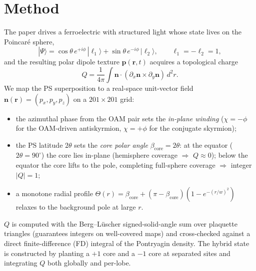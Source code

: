\documentclass[11pt]{article}
\begin{document}
\section{Method}
The paper drives a ferroelectric with structured light whose state lives on the
Poincar\'e sphere,
\begin{equation}
|\Psi\rangle = \cos\theta\, e^{+i\phi}\,|\ell_1\rangle
             + \sin\theta\, e^{-i\phi}\,|\ell_2\rangle,\qquad \ell_1=-\ell_2=1,
\end{equation}
and the resulting polar dipole texture $\mathbf{p}(\mathbf{r},t)$ acquires a
topological charge
\begin{equation}
Q=\frac{1}{4\pi}\int \mathbf{n}\cdot(\partial_x\mathbf{n}\times\partial_y\mathbf{n})\,d^2r .
\end{equation}
We map the PS superposition to a real-space unit-vector field
$\mathbf{n}(\mathbf{r})=(p_x,p_y,p_z)$ on a $201\times201$ grid:
\begin{itemize}
\item the azimuthal phase from the OAM pair sets the \emph{in-plane winding}
($\chi=-\phi$ for the OAM-driven antiskyrmion, $\chi=+\phi$ for the conjugate
skyrmion);
\item the PS latitude $2\theta$ sets the \emph{core polar angle}
$\beta_{\text{core}}=2\theta$: at the equator ($2\theta=90^\circ$) the core lies
in-plane (hemisphere coverage $\Rightarrow$ $Q\approx0$); below the equator the
core lifts to the pole, completing full-sphere coverage $\Rightarrow$ integer
$|Q|=1$;
\item a monotone radial profile $\Theta(r)=\beta_{\text{core}}+(\pi-\beta_{\text{core}})(1-e^{-(r/w)^2})$
relaxes to the background pole at large $r$.
\end{itemize}
$Q$ is computed with the Berg--L\"uscher signed-solid-angle sum over plaquette
triangles (guarantees integers on well-covered maps) and cross-checked against
a direct finite-difference (FD) integral of the Pontryagin density. The hybrid
state is constructed by planting a $+1$ core and a $-1$ core at separated sites
and integrating $Q$ both globally and per-lobe.
\end{document}
